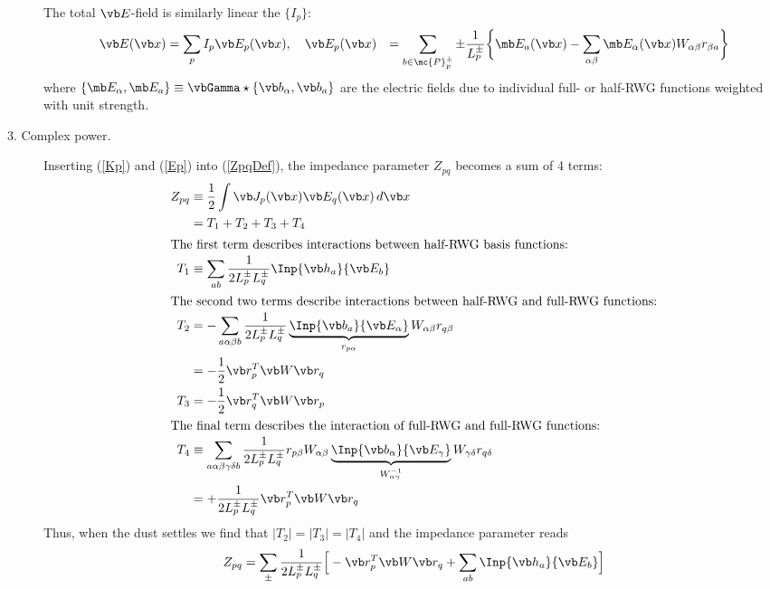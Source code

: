 \documentclass[letterpaper]{article}
\begin{document}
\begin{description}
The total $\vb E$-field is similarly linear the $\{I_p\}$:
\begin{align}
 \vb E(\vb x) 
&= \sum_p I_p \vb E_p(\vb x), 
\quad
\vb E_p(\vb x) 
&= \sum_{b\in\mc{P}^\pm_p}
   \pm \frac{1}{L_p^\pm}
   \bigg\{  \mb E_a(\vb x)
           -\sum_{\alpha\beta} \mb E_\alpha(\vb x) W_{\alpha\beta} r_{\beta a}
   \bigg\}
 \label{Ep}
\end{align}
where $\{\mb E_\alpha, \mb E_a\}\equiv \vbGamma \star \{\vb b_\alpha, \vb b_a\}$
are the electric fields due to individual
full- or half-RWG functions weighted with unit strength.
\item[3. Complex power.]
Inserting (\ref{Kp}) and (\ref{Ep}) into (\ref{ZpqDef}), the
impedance parameter $Z_{pq}$ becomes a sum of 4 terms:
\begin{align*}
 Z_{pq} 
 &\equiv \frac{1}{2}\int \vb J_p(\vb x) \vb E_q(\vb x)\,d\vb x
\\
 &= T_1 + T_2 + T_3 + T_4
\\
\intertext{The first term describes interactions between half-RWG basis functions:}
T_1 &\equiv \sum_{a b} \frac{1}{2 L_p^\pm L_q^\pm} \Inp{\vb h_a}{\vb E_b}
\\
\intertext{The second two terms describe interactions between half-RWG and full-RWG functions:}
T_2 &= -\sum_{a \alpha \beta b}
  \frac{1}{2L_p^\pm L_q^\pm}
 \underbrace{\Inp{\vb b_a}{\vb E_\alpha}}_{r_{p \alpha}}
  W_{\alpha\beta}
  r_{q \beta}
\\
 &= -\frac{1}{2}\vb r^T_p \vb W \vb r_q
\\
T_3 &= -\frac{1}{2}\vb r^T_q \vb W \vb r_p
\\
\intertext{The final term describes the interaction of full-RWG and full-RWG functions:}
 T_4 &\equiv \sum_{a \alpha\beta\gamma\delta b}
  \frac{1}{2L_p^\pm L_q^\pm}
  r_{p \beta}
  W_{\alpha\beta}
 \underbrace{\Inp{\vb b_\alpha}{\vb E_\gamma}}_{W_{\alpha\gamma}^{-1}}
  W_{\gamma\delta}
  r_{q \delta}
\\
&= + \frac{1}{2L_p^\pm L_q^\pm} \vb r_p^T \vb W \vb r_q
\end{align*}
Thus, when the dust settles we find that $|T_2|=|T_3|=|T_4|$
and the impedance parameter reads
$$ Z_{pq} = \sum_{\pm} \frac{1}{2L_p^\pm L_q^\pm}
 \Big[ -\vb r^T_p \vb W \vb r_q + \sum_{ab} \Inp{\vb h_a}{\vb E_b} \Big]
$$
\end{description}
\end{document}
